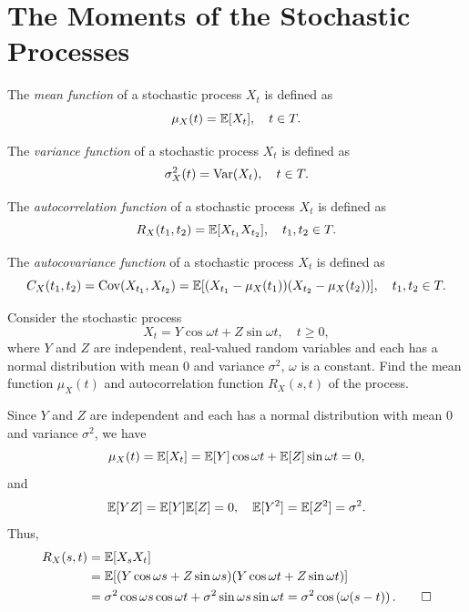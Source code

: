 \section{The Moments of the Stochastic Processes}

\begin{definition}
  The \emph{mean function} of a stochastic process \(X_t\) is defined as
  \[
    \mu_X(t) = \mathbb{E}[X_t], \quad t \in T.
  \]
\end{definition}

\begin{definition}
  The \emph{variance function} of a stochastic process \(X_t\) is defined as
  \[
    \sigma_X^2(t) = \mathrm{Var}(X_t), \quad t \in T.
  \]
\end{definition}

\begin{definition}
  The \emph{autocorrelation function} of a stochastic process \(X_t\) is defined as
  \[
    R_X(t_1, t_2) = \mathbb{E}[X_{t_1} X_{t_2}], \quad t_1, t_2 \in T.
  \]
\end{definition}

\begin{definition}
  The \emph{autocovariance function} of a stochastic process \(X_t\) is defined as
  \[
    C_X(t_1, t_2) = \mathrm{Cov}(X_{t_1}, X_{t_2}) = \mathbb{E}[(X_{t_1} - \mu_X(t_1))(X_{t_2} - \mu_X(t_2))], \quad t_1, t_2 \in T.
  \]
\end{definition}

\begin{example}
  Consider the stochastic process
  \[
    X_t = Y \cos\omega t + Z \sin\omega t, \quad t \geq 0,
  \]
  where \(Y\) and \(Z\) are independent, real-valued random variables and each has a normal distribution with mean \(0\) and variance \(\sigma^2\), \(\omega\) is a constant. Find the mean function \(\mu_X(t)\) and autocorrelation function \(R_X(s, t)\) of the process.
\end{example}
\begin{solution}
  Since \(Y\) and \(Z\) are independent and each has a normal distribution with mean \(0\) and variance \(\sigma^2\), we have
  \[
    \mu_X(t) = \mathbb{E}[X_t] = \mathbb{E}[Y]\cos\omega t + \mathbb{E}[Z]\sin\omega t = 0,
  \]
  and
  \[
    \mathbb{E}[Y Z] = \mathbb{E}[Y]\mathbb{E}[Z] = 0, \quad \mathbb{E}[Y^2] = \mathbb{E}[Z^2] = \sigma^2.
  \]
  Thus,
  \begin{align*}
    R_X(s, t) &= \mathbb{E}[X_s X_t] \\
    &= \mathbb{E}[(Y \cos\omega s + Z \sin\omega s)(Y \cos\omega t + Z \sin\omega t)] \\
    &= \sigma^2 \cos\omega s \cos\omega t + \sigma^2 \sin\omega s \sin\omega t = \sigma^2 \cos\left(\omega(s - t)\right). \qedhere
  \end{align*}
\end{solution}

